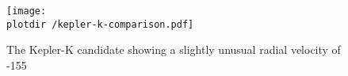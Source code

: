 
\begin{figure*}[tb!]
   \centering
   \texttt{[image: \\plotdir /kepler-k-comparison.pdf]} 

   \caption{The Kepler-K candidate showing a slightly unusual radial velocity of -155\kms}
   \label{fig:kepler-g}
\end{figure*}


